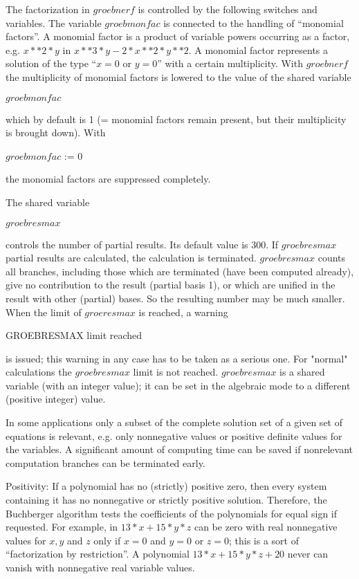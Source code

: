 The factorization in $groebnerf$ is controlled by the following
switches and variables.  The variable $groebmonfac$ is connected to
the handling of ``monomial factors''.  A monomial factor is a product
of variable powers occurring as a factor, e.g. $ x**2*y$  in  $x**3*y -
2*x**2*y**2$.  A monomial factor represents a solution of the type
``$ x = 0$  or  $y = 0$'' with a certain multiplicity.  With
$groeb$\-$nerf$ 
the multiplicity of monomial factors is lowered to the value of the
shared variable
\begin{center}
$groebmonfac$
\end{center}
which by default is 1 (= monomial factors remain present, but their
multiplicity is brought down). With
\begin{center}
$groebmonfac$ := 0
\end{center}
the monomial factors are suppressed completely.

The shared variable
\begin{center}
$groebresmax$
\end{center}
controls the number of partial results. Its default value is 300. If
$groebresmax$ partial results are calculated, the calculation is
terminated. $groebresmax$ counts all branches, including those which
are terminated (have been computed already), give no contribution to
the result (partial basis 1), or which are unified in the result with
other (partial) bases. So the resulting number may be much smaller.
When the limit of $groeresmax$ is reached, a warning

GROEBRESMAX limit reached

is issued; this warning in any case has to be taken as a serious one.
For "normal" calculations the $groebresmax$ limit is not reached.
$groebresmax$ is a shared variable (with an integer value); it can be
set in the algebraic mode to a different (positive integer) value.

In some applications only a subset of the complete solution set
of a given set of equations is relevant, e.g. only
nonnegative values or positive definite values for the variables.
A significant amount of computing time can be saved if
nonrelevant computation branches can be terminated early.

Positivity: If a polynomial has no (strictly) positive zero, then
every system containing it has no nonnegative or strictly positive
solution. Therefore, the Buchberger algorithm tests the coefficients of
the polynomials for equal sign if requested. For example, in $13*x +
15*y*z $ can be zero with real nonnegative values for $x, y$ and $z$
only if $x=0$ and $y=0$ or $ z=0$; this is a sort of ``factorization by
restriction''. A polynomial $13*x + 15*y*z + 20$ never can vanish
with nonnegative real variable values.

